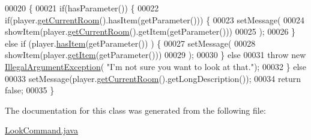 \begin{DoxyCode}
00020                                                                           \{
00021         \textcolor{keywordflow}{if}(hasParameter()) \{
00022             \textcolor{keywordflow}{if}(player.\hyperlink{classPlayer_a3a3107df50fc4e35e8c0f46c3f776ce6}{getCurrentRoom}().hasItem(getParameter())) \{
00023                 setMessage(
00024                         showItem(player.\hyperlink{classPlayer_a3a3107df50fc4e35e8c0f46c3f776ce6}{getCurrentRoom}().getItem(getParameter()))
00025                         );
00026             \} \textcolor{keywordflow}{else} \textcolor{keywordflow}{if} (player.\hyperlink{classPlayer_a90cb3f05b491eaed668fe54b9258b755}{hasItem}(getParameter()) ) \{
00027                 setMessage(
00028                         showItem(player.\hyperlink{classPlayer_a8c183303976b4ea5d0c10fdbff14e4a1}{getItem}(getParameter()))
00029                         );
00030             \} \textcolor{keywordflow}{else}
00031                 \textcolor{keywordflow}{throw} \textcolor{keyword}{new} \hyperlink{classIllegalArgumentException}{IllegalArgumentException}( \textcolor{stringliteral}{"I'm not sure you want to look
       at that."});
00032         \} \textcolor{keywordflow}{else}
00033             setMessage(player.\hyperlink{classPlayer_a3a3107df50fc4e35e8c0f46c3f776ce6}{getCurrentRoom}().getLongDescription());
00034         \textcolor{keywordflow}{return} \textcolor{keyword}{false};
00035     \}
\end{DoxyCode}


The documentation for this class was generated from the following file\-:\begin{DoxyCompactItemize}
\item 
\hyperlink{LookCommand_8java}{Look\-Command.\-java}\end{DoxyCompactItemize}
